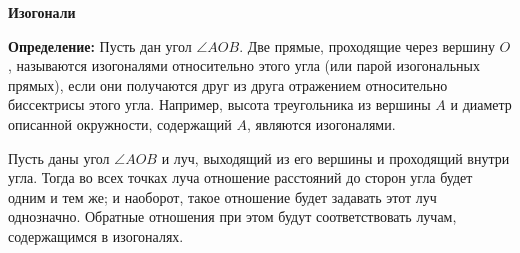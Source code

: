 \documentclass{article}
\begin{document}
    \large


    \begin{center}
        \textbf{Изогонали}
    \end{center}

    \textbf{Определение:} Пусть дан угол $\angle AOB$.
    Две прямые, проходящие через вершину $O$, называются изогоналями относительно этого угла (или парой изогональных прямых), если они получаются друг из друга отражением относительно биссектрисы этого угла.
    Например, высота треугольника из вершины $A$ и диаметр описанной окружности, содержащий $A$, являются изогоналями.

    Пусть даны угол $\angle AOB$ и луч, выходящий из его вершины и проходящий внутри угла.
    Тогда во всех точках луча отношение расстояний до сторон угла будет одним и тем же; и наоборот, такое отношение будет задавать этот луч однозначно.
    Обратные отношения при этом будут соответствовать лучам, содержащимся в изогоналях.
\end{document}
